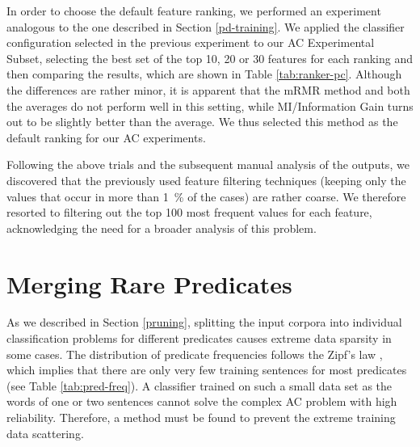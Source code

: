 \documentclass[12pt,notitlepage,a4paper]{report}
\begin{document}
In order to choose the default feature ranking, we performed an experiment analogous to the one described in Section \ref{pd-training}. We applied the classifier configuration selected in the previous experiment to our AC Experimental Subset, selecting the best set of the top 10, 20 or 30 features for each ranking and then comparing the results, which are shown in Table \ref{tab:ranker-pc}. Although the differences are rather minor, it is apparent that the mRMR method and both the averages do not perform well in this setting, while MI/Information Gain turns out to be slightly better than the average. We thus selected this method as the default ranking for our AC experiments.

Following the above trials and the subsequent manual analysis of the outputs, we discovered that the previously used feature filtering techniques (keeping only the values that occur in more than 1~\% of the cases) are rather coarse. We therefore resorted to filtering out the top 100 most frequent values for each feature, acknowledging the need for a broader analysis of this problem.

\section{Merging Rare Predicates}\label{ac-merge}

As we described in Section \ref{pruning}, splitting the input corpora into individual classification problems for different predicates causes extreme data sparsity in some cases. The distribution of predicate frequencies follows the Zipf's law \citep[p.~23ff.]{manning00}, which implies that there are only very few training sentences for most predicates (see Table \ref{tab:pred-freq}). A classifier trained on such a small data set as the words of one or two sentences cannot solve the complex AC problem with high reliability. Therefore, a method must be found to prevent the extreme training data scattering.
\end{document}
